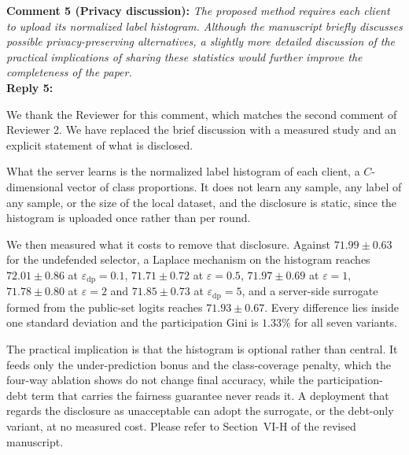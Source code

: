 \documentclass[10pt]{article}
\begin{document}
\noindent
\textbf{Comment 5 (Privacy discussion):} \textit{The proposed method requires each client to upload its normalized label histogram. Although the manuscript briefly discusses possible privacy-preserving alternatives, a slightly more detailed discussion of the practical implications of sharing these statistics would further improve the completeness of the paper.} \\
\noindent
\textbf{Reply 5:} {We thank the Reviewer for this comment, which matches the second comment of Reviewer 2. We have replaced the brief discussion with a measured study and an explicit statement of what is disclosed.

What the server learns is the normalized label histogram of each client, a $C$-dimensional vector of class proportions. It does not learn any sample, any label of any sample, or the size of the local dataset, and the disclosure is static, since the histogram is uploaded once rather than per round.

We then measured what it costs to remove that disclosure. Against $71.99 \pm 0.63$ for the undefended selector, a Laplace mechanism on the histogram reaches $72.01 \pm 0.86$ at $\varepsilon_{\mathrm{dp}} = 0.1$, $71.71 \pm 0.72$ at $\varepsilon = 0.5$, $71.97 \pm 0.69$ at $\varepsilon = 1$, $71.78 \pm 0.80$ at $\varepsilon = 2$ and $71.85 \pm 0.73$ at $\varepsilon_{\mathrm{dp}} = 5$, and a server-side surrogate formed from the public-set logits reaches $71.93 \pm 0.67$. Every difference lies inside one standard deviation and the participation Gini is $1.33\%$ for all seven variants.

The practical implication is that the histogram is optional rather than central. It feeds only the under-prediction bonus and the class-coverage penalty, which the four-way ablation shows do not change final accuracy, while the participation-debt term that carries the fairness guarantee never reads it. A deployment that regards the disclosure as unacceptable can adopt the surrogate, or the debt-only variant, at no measured cost. Please refer to Section~VI-H of the revised manuscript.}\\
\end{document}
